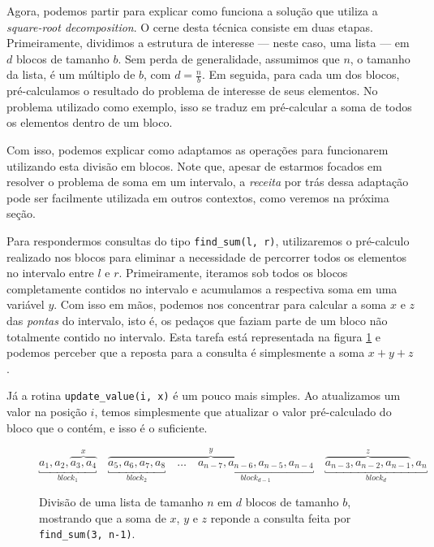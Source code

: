 Agora, podemos partir para explicar como funciona a solução que utiliza a \emph{square-root decomposition}. O cerne desta técnica consiste em duas etapas. Primeiramente, dividimos a estrutura de interesse --- neste caso, uma lista --- em $d$ blocos de tamanho $b$. Sem perda de generalidade, assumimos que $n$, o tamanho da lista, é um múltiplo de $b$, com $d = \frac{n}{b}$. Em seguida, para cada um dos blocos, pré-calculamos o resultado do problema de interesse de seus elementos. No problema utilizado como exemplo, isso se traduz em pré-calcular a soma de todos os elementos dentro de um bloco.

Com isso, podemos explicar como adaptamos as operações para funcionarem utilizando esta divisão em blocos. Note que, apesar de estarmos focados em resolver o problema de soma em um intervalo, a \emph{receita} por trás dessa adaptação pode ser facilmente utilizada em outros contextos, como veremos na próxima seção.

Para respondermos consultas do tipo \texttt{find\_sum(l, r)}, utilizaremos o pré-calculo realizado nos blocos para eliminar a necessidade de percorrer todos os elementos no intervalo entre $l$ e $r$. Primeiramente, iteramos sob todos os blocos completamente contidos no intervalo e acumulamos a respectiva soma em uma variável $y$. Com isso em mãos, podemos nos concentrar para calcular a soma $x$ e $z$ das \emph{pontas} do intervalo, isto é, os pedaços que faziam parte de um bloco não totalmente contido no intervalo. Esta tarefa está representada na figura \ref{fig:sqrt-decomp-blocks} e podemos perceber que a reposta para a consulta é simplesmente a soma $x + y + z$.

Já a rotina \texttt{update\_value(i, x)} é um pouco mais simples. Ao atualizamos um valor na posição $i$, temos simplesmente que atualizar o valor pré-calculado do bloco que o contém, e isso é o suficiente.

\begin{figure}
    \centering
    \begin{equation*}
        \underbracket{a_1, a_2, \overbrace{a_3, a_4}^x}_{block_1} \quad
        \overbrace{
            \underbracket{a_5, a_6, a_7, a_8}_{block_2} \quad
            \dots \quad
            \underbracket{a_{n-7}, a_{n-6}, a_{n-5}, a_{n-4}}_{block_{d-1}}
        }^y \quad
        \underbracket{\overbrace{a_{n-3}, a_{n-2}, a_{n-1}}^z, a_n}_{block_d}
    \end{equation*}
    \caption{Divisão de uma lista de tamanho $n$ em $d$ blocos de tamanho $b$, mostrando que a soma de $x$, $y$ e $z$ reponde a consulta feita por \texttt{find\_sum(3, n-1)}.}
    \label{fig:sqrt-decomp-blocks}
\end{figure}

